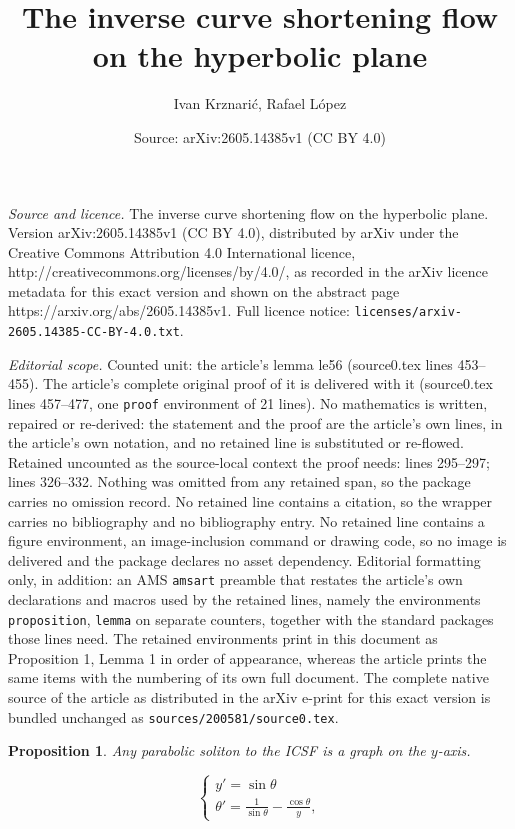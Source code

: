 \documentclass[10pt,a4paper]{amsart}
\title{The inverse curve shortening flow on the hyperbolic plane}
\author{Ivan Krznari\'c, Rafael L\'opez}
\date{Source: arXiv:2605.14385v1 (CC BY 4.0)}
\newtheorem{proposition}{Proposition}
\begin{document}
\maketitle

\noindent\emph{Source and licence.} The inverse curve shortening flow on the hyperbolic plane. Version arXiv:2605.14385v1 (CC BY 4.0), distributed by arXiv under the Creative Commons Attribution 4.0 International licence, http://creativecommons.org/licenses/by/4.0/, as recorded in the arXiv licence metadata for this exact version and shown on the abstract page https://arxiv.org/abs/2605.14385v1. Full licence notice: \texttt{licenses/arxiv-2605.14385-CC-BY-4.0.txt}.\par\smallskip

\noindent\textit{Editorial scope.} Counted unit: the article's lemma le56 (source0.tex lines 453--455). The article's complete original proof of it is delivered with it (source0.tex lines 457--477, one \texttt{proof} environment of 21 lines). No mathematics is written, repaired or re-derived: the statement and the proof are the article's own lines, in the article's own notation, and no retained line is substituted or re-flowed.  Retained uncounted as the source-local context the proof needs: lines 295--297; lines 326--332.  Nothing was omitted from any retained span, so the package carries no omission record.  No retained line contains a citation, so the wrapper carries no bibliography and no bibliography entry.  No retained line contains a figure environment, an image-inclusion command or drawing code, so no image is delivered and the package declares no asset dependency.  Editorial formatting only, in addition: an AMS \texttt{amsart} preamble that restates the article's own declarations and macros used by the retained lines, namely the environments \texttt{proposition}, \texttt{lemma} on separate counters, together with the standard packages those lines need.  The retained environments print in this document as Proposition 1, Lemma 1 in order of appearance, whereas the article prints the same items with the numbering of its own full document.  The complete native source of the article as distributed in the arXiv e-print for this exact version is bundled unchanged as \texttt{sources/200581/source0.tex}.
\begin{proposition}\label{prg}
 Any parabolic soliton to the ICSF is a graph on the $y$-axis.
\end{proposition}

\begin{equation}
\label{para2}
\begin{cases}
y' = \sin\theta \\
\displaystyle \theta' =  \frac{1}{\sin\theta} - \frac{\cos\theta}{y},
\end{cases}
\end{equation}
\end{document}
